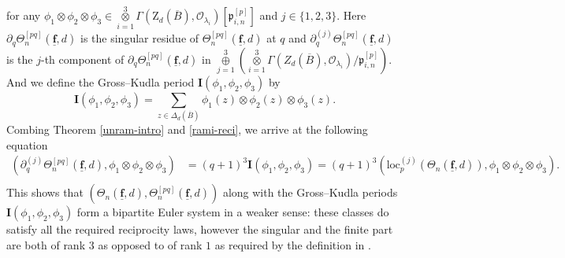\documentclass[10pt]{amsart}
\numberwithin{equation}{section}
\theoremstyle{plain}
\numberwithin{equation}{section}
\theoremstyle{definition}
\theoremstyle{remark}
\def\loc{\mathrm{loc}}
\def\triplef{\underline{\mathbf{f}}}
\def\threetensor{\overset{3}{\underset{i=1}\otimes}}
\def\threesum{\overset{3}{\underset{j=1}\oplus} }
\def\calO{\mathcal{O}}
\def\frakp{\mathfrak{p}}
\def\rmZ{\mathrm{Z}}
\begin{document}
 for any $\phi_{1}\otimes \phi_{2}\otimes \phi_{3}\in \threetensor\Gamma(\rmZ_{d}(\overline{B}),\calO_{\lambda_{i}})[\frakp^{[p]}_{i, n}]$ and $j\in\{1, 2, 3\}$. Here $\partial_{q}\Theta^{[pq]} _{n}(\triplef, d)$ is the singular residue of $\Theta^{[pq]} _{n}(\triplef, d)$ at $q$ and $\partial^{(j)}_{q}\Theta^{[pq]} _{n}(\triplef, d)$ is the $j$-th component of $\partial_{q}\Theta^{[pq]} _{n}(\triplef, d)$ in $\threesum(\threetensor\Gamma(Z_{d}(\overline{B}),\calO_{\lambda_{i}}){/\frakp^{[p]}_{i, n}})$. And we define the {Gross--Kudla period} $\mathbf{I}(\phi_{1}, \phi_{2}, \phi_{3})$  by 
 \begin{equation*}
 \mathbf{I}(\phi_{1}, \phi_{2}, \phi_{3})=\sum_{z\in \Delta_{d}(\overline{B})} \phi_{1}(z)\otimes \phi_{2}(z)\otimes \phi_{3}(z).
 \end{equation*}
Combing Theorem \ref{unram-intro} and \eqref{rami-reci}, we arrive at the following equation
\begin{equation*}
\begin{aligned}
(\partial^{(j)}_{q}\Theta^{ [pq]} _{n}(\triplef, d), \phi_{1}\otimes \phi_{2}\otimes \phi_{3})&=(q+1)^{3}\mathbf{I}(\phi_{1}, \phi_{2}, \phi_{3})=(q+1)^{3}(\loc^{(j)}_{p}(\Theta_{n}(\triplef, d)), \phi_{1}\otimes\phi_{2}\otimes\phi_{3}).\\
\end{aligned}
\end{equation*}
This shows that $(\Theta_{n}(\triplef, d), \Theta^{[pq]}_{n}(\triplef, d))$ along with the Gross--Kudla periods $\mathbf{I}(\phi_{1}, \phi_{2}, \phi_{3})$ form a {bipartite Euler system} in a weaker sense: these classes do satisfy all the required reciprocity laws, however the singular and the finite part are both of rank $3$ as opposed to of rank $1$ as required by the definition in \cite{How}. 

 
\end{document}
